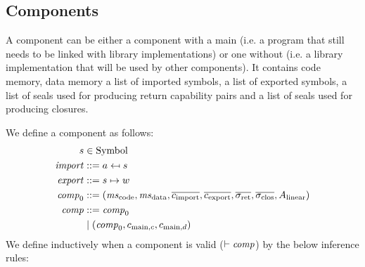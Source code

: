 \documentclass[a4paper]{article}
\begin{document}
\subsection{Components}
\label{sec:components}

A component can be either a component with a main (i.e. a program that still needs to be linked with library implementations) or one without (i.e. a library implementation that will be used by other components). 
It contains code memory, data memory a list of imported symbols, a list of exported symbols, a list of seals used for producing return capability pairs and a list of seals used for producing closures.

We define a component as follows:
\begin{align*}
  s &\in \Symbol\\
  \var{import} &\mathrel{::=} a \mapsfrom s\\
  \var{export} &\mathrel{::=} s \mapsto w\\
  \var{comp}_0 &\mathrel{::=} (\mscode,\msdata,\overline{c_{\mathrm{import}}},\overline{c_{\mathrm{export}}},\sigrets,\sigcloss,A_\linear)\\
  \var{comp} &\mathrel{::=} \var{comp}_0\\
               &\mid  (\var{comp}_0,c_{\mathrm{main},c}, c_{\mathrm{main},d})
\end{align*}
\clearpage
We define inductively when a component is valid ($\vdash \mathit{comp}$) by the below inference rules:
\end{document}
